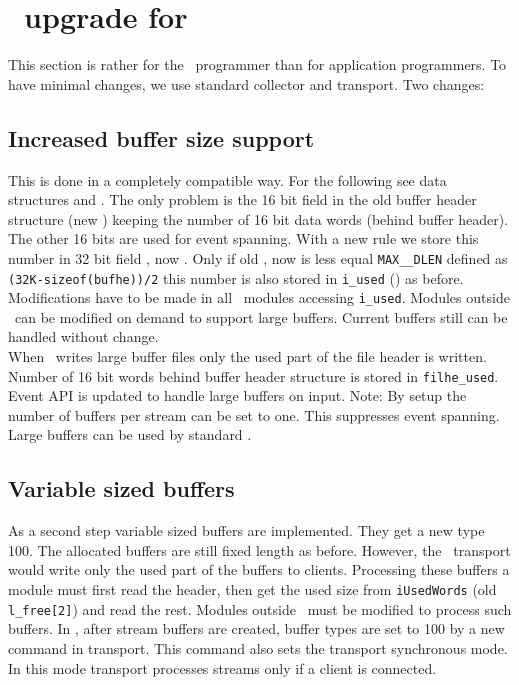 \section{\mbs\ upgrade for \dabc}
This section is rather for the \mbs\ programmer than for application programmers.
To have minimal changes, we use standard collector and transport. Two changes:
\subsection{Increased buffer size support}
This is done in a completely compatible way. 
For the following see data structures  and .
The only problem is the 16 bit  field in the old buffer header  structure (new ) keeping the number of 16 bit data words (behind buffer header). 
The other 16 bits are used for event spanning.
With a new rule we store this number in 32 bit field 
, now . Only if old , now  is less equal {\tt MAX\_\_DLEN} defined as {\tt (32K-sizeof(bufhe))/2} this number is also stored in {\tt i\_used} 
() as before. Modifications have to be made in all \mbs\ modules accessing {\tt i\_used}. Modules outside \mbs\ can be modified on demand to support large buffers. Current buffers still can be handled without change.\\
When \mbs\ writes large buffer files only the used part of the file header is written. Number of 16 bit words behind buffer header structure is stored in {\tt filhe\_used}.
Event API  is updated to handle large buffers on input.
Note: By setup the number of buffers per stream can be set to one. This suppresses event spanning.
Large buffers can be used by standard \mbs.
\subsection{Variable sized buffers}
As a second step variable sized buffers are implemented. They get a new type 100. The allocated buffers are still fixed length as before. However, the \mbs\ transport would write only the used part of the buffers to clients. Processing these buffers a module must first read the header, then get the used size from {\tt iUsedWords} (old {\tt l\_free[2]}) and read the rest. Modules outside \mbs\ must be modified to process such buffers.
In \mbs, after stream buffers are created, buffer types are set to 100 by a new command  in transport. This command also sets the transport synchronous mode. In this mode transport processes streams only if a client is connected.

